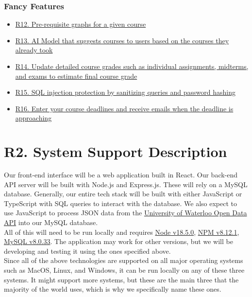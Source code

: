 \documentclass[12pt, a4paper]{article}
\begin{document}
\subsubsection*{Fancy Features}
\begin{itemize}
    \item \hyperref[sec:R12]{R12. Pre-requisite graphs for a given course}
    \item \hyperref[sec:R13]{R13. AI Model that suggests courses to users based on the courses they already took}
    \item \hyperref[sec:R14]{R14. Update detailed course grades such as individual assignments, midterms, and exams to estimate final course grade}
    \item \hyperref[sec:R15]{R15. SQL injection protection by sanitizing queries and password hashing}
    \item \hyperref[sec:R16]{R16. Enter your course deadlines and receive emails when the deadline is approaching}
\end{itemize}

\section*{R2. System Support Description}
\label{sec:R2}

Our front-end interface will be a web application built in React. Our back-end API server will be built with Node.js and Express.js. These will rely on a MySQL database. Generally, our entire tech stack will be built with either JavaScript or TypeScript with SQL queries to interact with the database. We also expect to use JavaScript to process JSON data from the \href{https://openapi.data.uwaterloo.ca/api-docs/index.html}{University of Waterloo Open Data API} into our MySQL database.\\

All of this will need to be run locally and requires \href{https://nodejs.org/en/download}{Node v18.5.0}, \href{https://nodejs.org/en/download}{NPM v8.12.1}, \href{https://dev.mysql.com/downloads/mysql/}{MySQL v8.0.33}. The application may work for other versions, but we will be developing and testing it using the ones specified above.\\

Since all of the above technologies are supported on all major operating systems such as MacOS, Linux, and Windows, it can be run locally on any of these three systems. It might support more systems, but these are the main three that the majority of the world uses, which is why we specifically name these ones.
\end{document}
